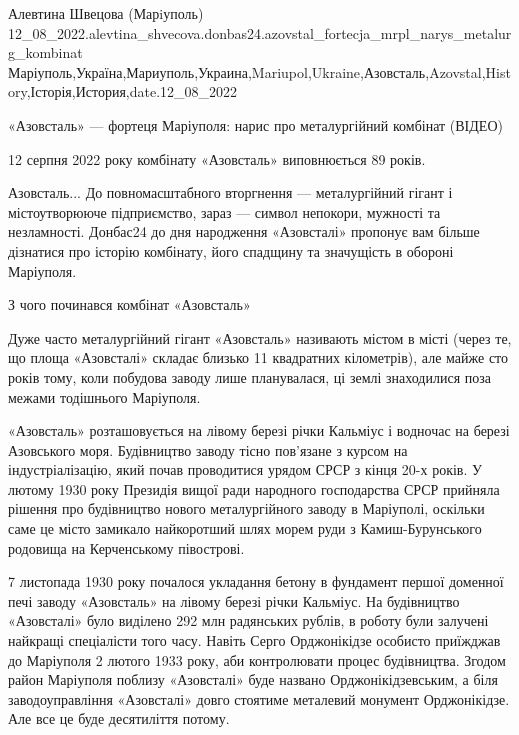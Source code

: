  
 
 
 
 

Алевтина Швецова (Марiуполь)
12_08_2022.alevtina_shvecova.donbas24.azovstal_fortecja_mrpl_narys_metalurg_kombinat
Маріуполь,Україна,Мариуполь,Украина,Mariupol,Ukraine,Азовсталь,Azovstal,History,Історія,История,date.12_08_2022

«Азовсталь» — фортеця Маріуполя: нарис про металургійний комбінат (ВІДЕО)

12 серпня 2022 року комбінату «Азовсталь» виповнюється 89 років.

Азовсталь... До повномасштабного вторгнення — металургійний гігант і
містоутворююче підприємство, зараз — символ непокори, мужності та незламності.
Донбас24 до дня народження «Азовсталі» пропонує вам більше дізнатися про
історію комбінату, його спадщину та значущість в обороні Маріуполя.

З чого починався комбінат «Азовсталь»

Дуже часто металургійний гігант «Азовсталь» називають містом в місті (через те,
що площа «Азовсталі» складає близько 11 квадратних кілометрів), але майже сто
років тому, коли побудова заводу лише планувалася, ці землі знаходилися поза
межами тодішнього Маріуполя.

«Азовсталь» розташовується на лівому березі річки Кальміус і водночас на березі
Азовського моря. Будівництво заводу тісно пов'язане з курсом на
індустріалізацію, який почав проводитися урядом СРСР з кінця 20-х років. У
лютому 1930 року Президія вищої ради народного господарства СРСР прийняла
рішення про будівництво нового металургійного заводу в Маріуполі, оскільки саме
це місто замикало найкоротший шлях морем руди з Камиш-Бурунського родовища на
Керченському півострові.

7 листопада 1930 року почалося укладання бетону в фундамент першої доменної
печі заводу «Азовсталь» на лівому березі річки Кальміус. На будівництво
«Азовсталі» було виділено 292 млн радянських рублів, в роботу були залучені
найкращі спеціалісти того часу. Навіть Серго Орджонікідзе особисто приїжджав до
Маріуполя 2 лютого 1933 року, аби контролювати процес будівництва. Згодом район
Маріуполя поблизу «Азовсталі» буде названо Орджонікідзевським, а біля
заводоуправління «Азовсталі» довго стоятиме металевий монумент Орджонікідзе.
Але все це буде десятиліття потому.

